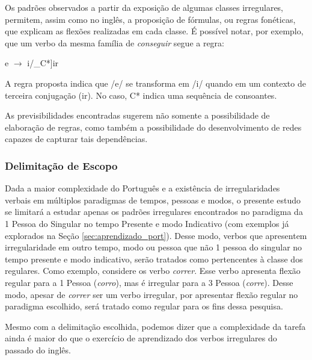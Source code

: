 Os padrões observados a partir da exposição de algumas classes irregulares, permitem, assim como no inglês, a proposição de fórmulas, ou regras fonéticas, que explicam as flexões realizadas em cada classe. É possível notar, por exemplo, que um verbo da mesma família de \textit{conseguir} segue a regra:

\begin{center}
e $\rightarrow$ i/\_C*]ir 
\end{center}

A regra proposta indica que /e/ se transforma em /i/ quando em um contexto de terceira conjugação (ir). No caso, C* indica uma sequência de consoantes. 

As previsibilidades encontradas sugerem não somente a possibilidade de elaboração de regras, como também a possibilidade do desenvolvimento de redes capazes de capturar tais dependências. 

\subsubsection{Delimitação de Escopo}

Dada a maior complexidade do Português e a existência de irregularidades verbais em múltiplos paradigmas de tempos, pessoas e modos, o presente estudo se limitará a estudar apenas os padrões irregulares encontrados no paradigma da 1 Pessoa do Singular no tempo Presente e modo Indicativo (com exemplos já explorados na Seção \ref{sec:aprendizado_port}). Desse modo, verbos que apresentem irregularidade em outro tempo, modo ou pessoa que não 1 pessoa do singular no tempo presente e modo indicativo, serão tratados como pertencentes à classe dos regulares. Como exemplo, considere os verbo \textit{correr}. Esse verbo apresenta flexão regular para a 1 Pessoa (\textit{corro}), mas é irregular para a 3 Pessoa (\textit{corre}). Desse modo, apesar de \textit{correr} ser um verbo irregular, por apresentar flexão regular no paradigma escolhido, será tratado como regular para os fins dessa pesquisa.

Mesmo com a delimitação escolhida, podemos dizer que a complexidade da tarefa ainda é maior do que o exercício de aprendizado dos verbos irregulares do passado do inglês. 

 



